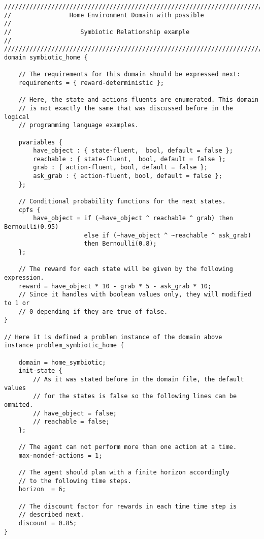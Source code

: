 \begin{lstlisting}[label = code:rddl]
////////////////////////////////////////////////////////////////////////
// 				  Home Environment Domain with possible               //
//                   Symbiotic Relationship example                   //
////////////////////////////////////////////////////////////////////////
domain symbiotic_home {

	// The requirements for this domain should be expressed next:
	requirements = { reward-deterministic };

	// Here, the state and actions fluents are enumerated. This domain
	// is not exactly the same that was discussed before in the logical
	// programming language examples.

	pvariables {
		have_object : { state-fluent,  bool, default = false };
		reachable : { state-fluent,  bool, default = false };
		grab : { action-fluent, bool, default = false };
		ask_grab : { action-fluent, bool, default = false };
	};

	// Conditional probability functions for the next states.
	cpfs {
		have_object = if (~have_object ^ reachable ^ grab) then Bernoulli(0.95)
					  else if (~have_object ^ ~reachable ^ ask_grab)
					  then Bernoulli(0.8);
	};

	// The reward for each state will be given by the following expression.
	reward = have_object * 10 - grab * 5 - ask_grab * 10;
	// Since it handles with boolean values only, they will modified to 1 or
	// 0 depending if they are true of false.
}

// Here it is defined a problem instance of the domain above
instance problem_symbiotic_home {

	domain = home_symbiotic;
	init-state {
		// As it was stated before in the domain file, the default values
		// for the states is false so the following lines can be ommited.
		// have_object = false;
		// reachable = false;
	};

	// The agent can not perform more than one action at a time.
	max-nondef-actions = 1;

	// The agent should plan with a finite horizon accordingly
	// to the following time steps.
	horizon  = 6;

	// The discount factor for rewards in each time time step is
	// described next.
	discount = 0.85;
}
\end{lstlisting}
